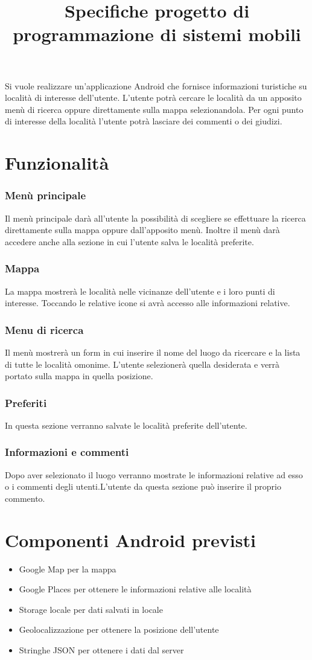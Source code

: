 \documentclass[a4paper,12pt]{article}
\title{Specifiche progetto di programmazione di sistemi mobili}
\begin{document}
\maketitle
Si vuole realizzare un'applicazione Android che fornisce informazioni turistiche su località di interesse dell'utente. L'utente potrà cercare le località da un apposito menù di ricerca oppure direttamente sulla mappa selezionandola. Per ogni punto di interesse della località l'utente potrà lasciare dei commenti o dei giudizi.

\section*{Funzionalità}
\subsubsection*{Menù principale}
Il menù principale darà all'utente la possibilità di scegliere se effettuare la ricerca direttamente sulla mappa oppure dall'apposito menù. Inoltre il menù darà accedere anche alla sezione in cui l'utente salva le località preferite.
\subsubsection*{Mappa}
La mappa mostrerà le località nelle vicinanze dell'utente e i loro punti di interesse. Toccando le relative icone si avrà accesso alle informazioni relative.
\subsubsection*{Menu di ricerca}
Il menù mostrerà un form in cui inserire il nome del luogo da ricercare e la lista di tutte le località omonime. L'utente selezionerà quella desiderata e verrà portato sulla mappa in quella posizione.
\subsubsection*{Preferiti}
In questa sezione verranno salvate le località preferite dell'utente.
\subsubsection*{Informazioni e commenti} 
Dopo aver selezionato il luogo verranno mostrate le informazioni relative ad esso o i commenti degli utenti.L'utente da questa sezione può inserire il proprio commento.

\section*{Componenti Android previsti}
\begin{itemize}
\item Google Map per la mappa
\item Google Places per ottenere le informazioni relative alle località
\item Storage locale per dati salvati in locale
\item Geolocalizzazione per ottenere la posizione dell'utente
\item Stringhe JSON per ottenere i dati dal server

\end{itemize}
\end{document}
